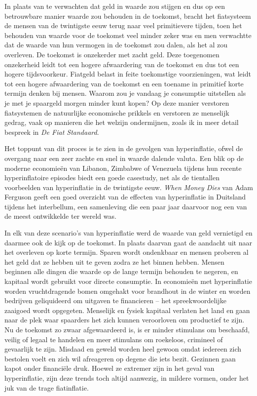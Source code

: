 In plaats van te verwachten dat geld in waarde zou stijgen en dus op een betrouwbare manier waarde zou behouden in de toekomst, bracht het fiatsysteem de mensen van de twintigste eeuw terug naar veel primitievere tijden, toen het behouden van waarde voor de toekomst veel minder zeker was en men verwachtte dat de waarde van hun vermogen in de toekomst zou dalen, als het al zou overleven. De toekomst is onzekerder met zacht geld. Deze toegenomen onzekerheid leidt tot een hogere afwaardering van de toekomst en dus tot een hogere tijdsvoorkeur. Fiatgeld belast in feite toekomstige voorzieningen, wat leidt tot een hogere afwaardering van de toekomst en een toename in primitief korte termijn denken bij mensen. Waarom zou je vandaag je consumptie uitstellen als je met je spaargeld morgen minder kunt kopen? Op deze manier verstoren fiatsystemen de natuurlijke economische prikkels en verstoren ze menselijk gedrag, vaak op manieren die het welzijn ondermijnen, zoals ik in meer detail bespreek in \emph{De Fiat Standaard}.

Het toppunt van dit proces is te zien in de gevolgen van hyperinflatie, ofwel de overgang naar een zeer zachte en snel in waarde dalende valuta. Een blik op de moderne economieën van Libanon, Zimbabwe of Venezuela tijdens hun recente hyperinflatoire episodes biedt een goede casestudy, net als de tientallen voorbeelden van hyperinflatie in de twintigste eeuw. \emph{When Money Dies} van Adam Ferguson geeft een goed overzicht van de effecten van hyperinflatie in Duitsland tijdens het interbellum, een samenleving die een paar jaar daarvoor nog een van de meest ontwikkelde ter wereld was.\autocite{151}

In elk van deze scenario's van hyperinflatie werd de waarde van geld vernietigd en daarmee ook de kijk op de toekomst. In plaats daarvan gaat de aandacht uit naar het overleven op korte termijn. Sparen wordt ondenkbaar en mensen proberen al het geld dat ze hebben uit te geven zodra ze het binnen hebben. Mensen beginnen alle dingen die waarde op de lange termijn behouden te negeren, en kapitaal wordt gebruikt voor directe consumptie. In economieën met hyperinflatie worden vruchtdragende bomen omgehakt voor brandhout in de winter en worden bedrijven geliquideerd om uitgaven te financieren -- het spreekwoordelijke zaaigoed wordt opgegeten. Menselijk en fysiek kapitaal verlaten het land en gaan naar de plek waar spaarders het zich kunnen veroorloven om productief te zijn. Nu de toekomst zo zwaar afgewaardeerd is, is er minder stimulans om beschaafd, veilig of legaal te handelen en meer stimulans om roekeloos, crimineel of gevaarlijk te zijn. Misdaad en geweld worden heel gewoon omdat iedereen zich bestolen voelt en zich wil afreageren op degene die iets bezit. Gezinnen gaan kapot onder financiële druk. Hoewel ze extremer zijn in het geval van hyperinflatie, zijn deze trends toch altijd aanwezig, in mildere vormen, onder het juk van de trage fiatinflatie.

